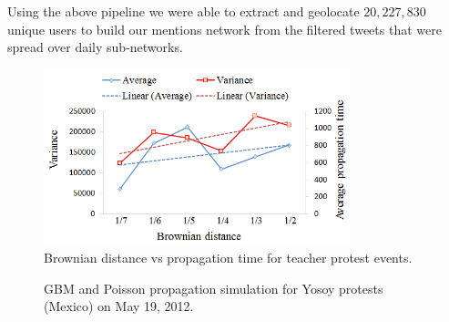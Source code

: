 Using the above pipeline we were able to extract and geolocate $20,227,830$ unique users to build our mentions network from the filtered tweets that were spread over daily sub-networks.


\begin{figure}[t]
\centering
\includegraphics[width=3.5in] {figures/infectdTime.png}
\caption{Brownian distance vs propagation time
for teacher protest events.}
\label{fig:timecurve}
\end{figure}




\begin{figure}[t]
\centering
{}
\caption{GBM and Poisson propagation simulation for Yosoy protests
(Mexico) on May 19, 2012.}
\label{fig:1Yosoy2012may}
\end{figure}


